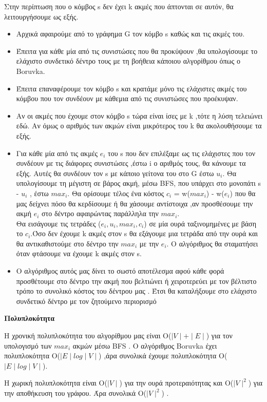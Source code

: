 \documentclass[12pt,a4paper]{article}
\begin{document}
\par Στην περίπτωση που ο κόμβος s δεν έχει k ακμές που άπτονται σε αυτόν, θα λειτουργήσουμε ως εξής.
\begin{itemize}
    \item Αρχικά αφαιρούμε από το γράφημα G τον κόμβο s καθώς και τις ακμές του.
    \item Έπειτα για κάθε μία από τις συνιστώσες που θα προκύψουν ,θα υπολογίσουμε το ελάχιστο συνδετικό δέντρο τους με τη βοήθεια κάποιου αλγορίθμου όπως ο Boruvka. 
    \item Έπειτα επαναφέρουμε τον κόμβο s και κρατάμε μόνο τις ελάχιστες ακμές του κόμβου που τον συνδέουν με κάθεμια από τις συνιστώσες που προέκυψαν.
    \item Αν οι ακμές που έχουμε στον κόμβο s τώρα είναι ίσες με k ,τότε η λύση τελειώνει εδώ. Αν όμως ο αριθμός των ακμών είναι μικρότερος του k θα ακολουθήσουμε τα εξής.
    \item Για κάθε μία από τις ακμές $e_i$ του s που δεν επιλέξαμε ως τις ελάχιστες που τον συνδέουν με τις διάφορες συνιστώσες ,έστω i ο αριθμός τους, θα κάνουμε τα εξής. Αυτές θα συνδέουν τον s με κάποιο γείτονα του στο G έστω $u_i$. Θα υπολογίσουμε τη μέγιστη σε βάρος ακμή, μέσω BFS, που υπάρχει στο μονοπάτι s - $u_i$ , έστω $max_i$. Θα ορίσουμε τέλος ένα κόστος $c_i$ = w($max_i$) - w($e_i$) που θα μας δείχνει πόσο θα κερδίσουμε ή θα χάσουμε αντίστοιχα ,αν προσθέσουμε την ακμή $e_i$ στο δέντρο αφαιρώντας παράλληλα την $max_i$.\\
    Θα εισάγουμε τις τετράδες ($e_i,u_i,max_i,c_i$) σε μία ουρά ταξινομημένες με βάση το $c_i$.Όσο δεν έχουμε k ακμές στον s θα εξάγουμε μια τετράδα από την ουρά και θα αντικαθιστούμε στο δέντρο την $max_i$ με την $e_i$. Ο αλγόριθμος θα σταματήσει όταν φτάσουμε να έχουμε k ακμές στον s.
    \item Ο αλγόριθμος αυτός μας δίνει το σωστό αποτέλεσμα αφού κάθε φορά προσθέτουμε στο δέντρο την ακμή που βελτιώνει ή χειροτερεύει με τον βέλτιστο τρόπο το συνολικό κόστος του δέντρου μας . Έτσι θα καταλήξουμε στο ελάχιστο συνδετικό δέντρο με τον ζητούμενο περιορισμό 
\end{itemize}

\begin{center}
    \textbf{Πολυπλοκότητα}
\end{center}

Η χρονική πολυπλοκότητα του αλγορίθμου μας είναι Ο($\mid V \mid + \mid E\mid$) για τον υπολογισμό των $max_i$ ακμών μέσω BFS . Ο αλγόριθμος Boruvka έχει πολυπλοκότητα O($\mid E \mid log\mid V\mid$) ,άρα συνολικά έχουμε πολυπλοκότητα O($\mid E \mid log\mid V\mid$).
\par Η χωρική πολυπλοκότητα είναι O($\mid V \mid$) για την ουρά προτεραιότητας και Ο($\mid V \mid^2$) για την αποθήκευση του γράφου. Άρα συνολικά Ο($\mid V \mid^2$) .
\end{document}
